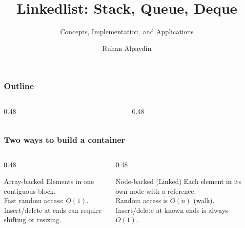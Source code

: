 \documentclass[aspectratio=169,10pt,compress]{beamer}
\title{Linkedlist: Stack, Queue, Deque}
\subtitle{Concepts, Implementation, and Applications}
\author[Alpaydin]{Ruhan Alpaydin}
\institute[FCIS]{Faculty of Computer and Information Sciences\\Yeditepe University}
\date{{\tiny \hbTimeStamp}}
\begin{document}
\begin{frame}[t,fragile]
  \titlepage
\end{frame}

\begin{frame}[t,fragile]\frametitle{Outline}
  \begin{columns}[T]
    \begin{column}{0.48\textwidth}
      \tableofcontents[sections={1-2},hideallsubsections]
    \end{column}
    \begin{column}{0.48\textwidth}
      \tableofcontents[sections={3},hideallsubsections]
    \end{column}
  \end{columns}
\end{frame}


\begin{frame}[t,fragile]\frametitle{Two ways to build a container}
  \begin{columns}[T]
    \begin{column}{0.48\textwidth}
      \begin{block}{Array-backed}
        \small
        Elements in one contiguous block.\\
        Fast random access: $O(1)$.\\
        Insert/delete at ends can require shifting or resizing.
      \end{block}
    \end{column}
    \begin{column}{0.48\textwidth}
      \begin{block}{Node-backed (Linked)}
        \small
        Each element in its own node with a reference.\\
        Random access is $O(n)$ (walk).\\
        Insert/delete at known ends is always $O(1)$.
      \end{block}
    \end{column}
  \end{columns}
  \vspace{0.4em}
  \small
\end{frame}
\end{document}
